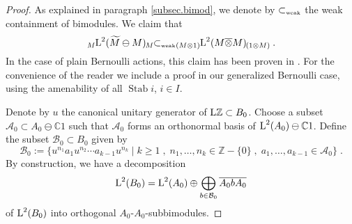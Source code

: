 \documentclass[a4paper,11pt]{amsart}
\numberwithin{equation}{section}
\begin{document}
\begin{proof}
As explained in paragraph \ref{subsec.bimod}, we denote by ${\subset_{\text{\rm\tiny weak}}}$ the weak containment of bimodules. We claim that
\begin{equation}\label{eq.claimweak}
{\mathord{\raisebox{-0.4ex}[0ex][0ex]{\scriptsize ${M}$}{{{\mathord{\text{\rm L}}}^2({\widetilde{M}} \ominus M)}}\hspace{-0.2ex}\raisebox{-0.4ex}[0ex][0ex]{\scriptsize ${M}$}}} {\subset_{\text{\rm\tiny weak}}} {\mathord{\raisebox{-0.4ex}[0ex][0ex]{\scriptsize ${(M {\otimes} 1)}$}{{{\mathord{\text{\rm L}}}^2(M {\mathbin{\overline{\otimes}}} M)}}\hspace{-0.2ex}\raisebox{-0.4ex}[0ex][0ex]{\scriptsize ${(1 {\otimes} M)}$}}} \; .
\end{equation}
In the case of plain Bernoulli actions, this claim has been proven in \cite[Lemma 5]{CI08}. For the convenience of the reader we include a proof in our generalized Bernoulli case, using the amenability of all ${\operatorname{Stab}} i$, $i \in I$.

Denote by $u$ the canonical unitary generator of ${\mathord{\text{\rm L}}} {\mathbb{Z}} \subset B_0$. Choose a subset ${\mathcal{A}}_0 \subset A_0 \ominus {\mathbb{C}} 1$ such that ${\mathcal{A}}_0$ forms an orthonormal basis of ${\mathord{\text{\rm L}}}^2(A_0) \ominus {\mathbb{C}} 1$. Define the subset ${\mathcal{B}}_0 \subset B_0$ given by
$${\mathcal{B}}_0 := \{u^{n_1} a_1 u^{n_2} \cdots a_{k-1} u^{n_k} \mid k {\geqslant} 1 \; , \; n_1,\ldots,n_k \in {\mathbb{Z}} - \{0\} \; , \; a_1,\ldots,a_{k-1} \in {\mathcal{A}}_0 \} \; .$$
By construction, we have a decomposition
$${\mathord{\text{\rm L}}}^2(B_0) = {\mathord{\text{\rm L}}}^2(A_0) \oplus \bigoplus_{b \in {\mathcal{B}}_0} \overline{A_0 b A_0}$$
of ${\mathord{\text{\rm L}}}^2(B_0)$ into orthogonal $A_0$-$A_0$-subbimodules.


\end{proof}
\end{document}
